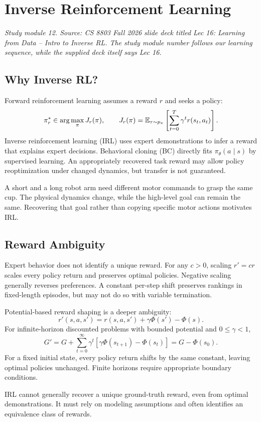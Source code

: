 \chapter{Inverse Reinforcement Learning}
\label{ch:inverse_rl}
\noindent\textit{Study module 12. Source: CS 8803 Fall 2026 slide deck titled Lec 16: Learning from Data -- Intro to Inverse RL. The study module number follows our learning sequence, while the supplied deck itself says Lec 16.}

\section{Why Inverse RL?}
Forward reinforcement learning assumes a reward $r$ and seeks a policy:
\[
\pi_r^*\in\arg\max_\pi J_r(\pi),\qquad
J_r(\pi)=\mathbb{E}_{\tau\sim p_\pi}\left[\sum_{t=0}^{T}\gamma^t r(s_t,a_t)\right].
\]
Inverse reinforcement learning (IRL) uses expert demonstrations to infer a reward that explains expert decisions. Behavioral cloning (BC) directly fits $\pi_\theta(a\mid s)$ by supervised learning. An appropriately recovered task reward may allow policy reoptimization under changed dynamics, but transfer is not guaranteed.

\begin{intuition}
A short and a long robot arm need different motor commands to grasp the same cup. The physical dynamics change, while the high-level goal can remain the same. Recovering that goal rather than copying specific motor actions motivates IRL.
\end{intuition}

\section{Reward Ambiguity}
Expert behavior does not identify a unique reward. For any $c>0$, scaling $r'=cr$ scales every policy return and preserves optimal policies. Negative scaling generally reverses preferences. A constant per-step shift preserves rankings in fixed-length episodes, but may not do so with variable termination.

Potential-based reward shaping is a deeper ambiguity:
\[
r'(s,a,s')=r(s,a,s')+\gamma\Phi(s')-\Phi(s).
\]
For infinite-horizon discounted problems with bounded potential and $0\le\gamma<1$,
\[
G'=G+\sum_{t=0}^{\infty}\gamma^t
[\gamma\Phi(s_{t+1})-\Phi(s_t)]=G-\Phi(s_0).
\]
For a fixed initial state, every policy return shifts by the same constant, leaving optimal policies unchanged. Finite horizons require appropriate boundary conditions.
\begin{pitfall}
IRL cannot generally recover a unique ground-truth reward, even from optimal demonstrations. It must rely on modeling assumptions and often identifies an equivalence class of rewards.
\end{pitfall}

